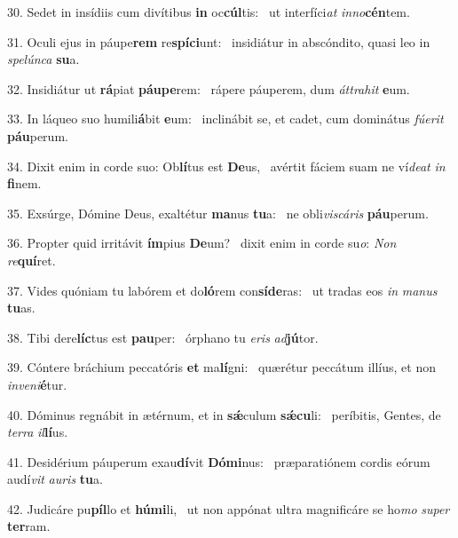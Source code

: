 30. Sedet in insídiis cum divítibus \textbf{in} oc\textbf{cúl}tis: \ast\  ut interfíci\textit{at} \textit{in}\textit{no}\textbf{cén}tem.\

31. Oculi ejus in páupe\textbf{rem} re\textbf{spí}\textbf{ci}unt: \ast\  insidiátur in abscóndito, quasi leo in \textit{spe}\textit{lún}\textit{ca} \textbf{su}a.\

32. Insidiátur ut \textbf{rá}piat \textbf{páu}\textbf{pe}rem: \ast\  rápere páuperem, dum \textit{át}\textit{tra}\textit{hit} \textbf{e}um.\

33. In láqueo suo humili\textbf{á}bit \textbf{e}um: \ast\  inclinábit se, et cadet, cum dominátus \textit{fú}\textit{e}\textit{rit} \textbf{páu}perum.\

34. Dixit enim in corde suo: Ob\textbf{lí}tus est \textbf{De}us, \ast\  avértit fáciem suam ne ví\textit{de}\textit{at} \textit{in} \textbf{fi}nem.\

35. Exsúrge, Dómine Deus, exaltétur \textbf{ma}nus \textbf{tu}a: \ast\  ne obli\textit{vis}\textit{cá}\textit{ris} \textbf{páu}perum.\

36. Propter quid irritávit \textbf{ím}pius \textbf{De}um? \ast\  dixit enim in corde su\textit{o}: \textit{Non} \textit{re}\textbf{quí}ret.\

37. Vides quóniam tu labórem et do\textbf{ló}rem con\textbf{sí}\textbf{de}ras: \ast\  ut tradas eos \textit{in} \textit{ma}\textit{nus} \textbf{tu}as.\

38. Tibi dere\textbf{líc}tus est \textbf{pau}per: \ast\  órphano tu \textit{e}\textit{ris} \textit{ad}\textbf{jú}tor.\

39. Cóntere bráchium peccatóris \textbf{et} ma\textbf{lí}gni: \ast\  quærétur peccátum illíus, et non \textit{in}\textit{ve}\textit{ni}\textbf{é}tur.\

40. Dóminus regnábit in ætérnum, et in \textbf{sǽ}culum \textbf{sǽ}\textbf{cu}li: \ast\  períbitis, Gentes, de \textit{ter}\textit{ra} \textit{il}\textbf{lí}us.\

41. Desidérium páuperum exau\textbf{dí}vit \textbf{Dó}\textbf{mi}nus: \ast\  præparatiónem cordis eórum audí\textit{vit} \textit{au}\textit{ris} \textbf{tu}a.\

42. Judicáre pu\textbf{píl}lo et \textbf{hú}\textbf{mi}li, \ast\  ut non appónat ultra magnificáre se ho\textit{mo} \textit{su}\textit{per} \textbf{ter}ram.\

